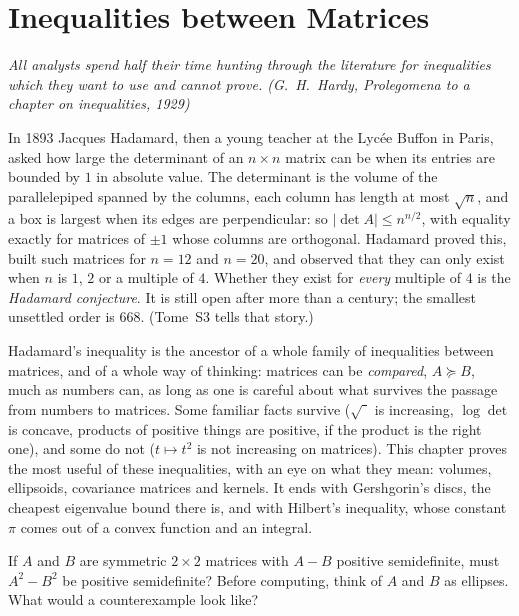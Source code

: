 \chapter{Inequalities between Matrices}\label{ch:inequalities}

\begin{center}\itshape
All analysts spend half their time hunting through the literature for inequalities which they want to use and cannot prove.
\upshape(G.~H.~Hardy, \emph{Prolegomena to a chapter on inequalities}, 1929)
\end{center}

In 1893 Jacques Hadamard, then a young teacher at the Lyc\'ee Buffon in Paris, asked how large the determinant of an $n\times n$
matrix can be when its entries are bounded by $1$ in absolute value. The determinant is the volume of the parallelepiped spanned by
the columns, each column has length at most $\sqrt n$, and a box is largest when its edges are perpendicular: so $|\det A|\le n^{n/2}$,
with equality exactly for matrices of $\pm1$ whose columns are orthogonal. Hadamard proved this, built such matrices for $n=12$
and $n=20$, and observed that they can only exist when $n$ is $1$, $2$ or a multiple of $4$. Whether they exist for \emph{every}
multiple of $4$ is the \emph{Hadamard conjecture}. It is still open after more than a century; the smallest unsettled order is
$668$. (Tome~S3 tells that story.)

Hadamard's inequality is the ancestor of a whole family of inequalities between matrices, and of a whole way of thinking: matrices
can be \emph{compared}, $A\succeq B$, much as numbers can, as long as one is careful about what survives the passage from numbers to
matrices. Some familiar facts survive ($\sqrt{\phantom{t}}$ is increasing, $\log\det$ is concave, products of positive things are
positive, if the product is the right one), and some do not ($t\mapsto t^2$ is not increasing on matrices). This chapter proves
the most useful of these inequalities, with an eye on what they mean: volumes, ellipsoids, covariance matrices and kernels. It ends
with Gershgorin's discs, the cheapest eigenvalue bound there is, and with Hilbert's inequality, whose constant $\pi$ comes out of a
convex function and an integral.

\begin{think}
If $A$ and $B$ are symmetric $2\times2$ matrices with $A-B$ positive semidefinite, must $A^2-B^2$ be positive semidefinite?
Before computing, think of $A$ and $B$ as ellipses. What would a counterexample look like?
\end{think}

